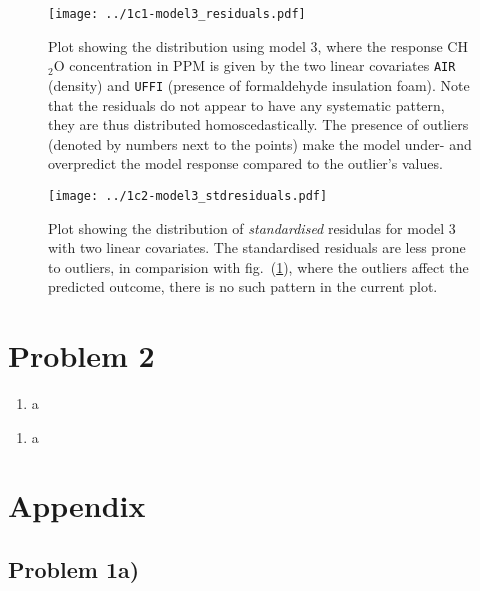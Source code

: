 \documentclass[a4paper,11pt]{article}
\begin{document}
\begin{enumerate}[label=\alph*)]
        \begin{figure}[htb]
            \centering
            \texttt{[image: ../1c1-model3\_residuals.pdf]}
            \caption{Plot showing the distribution using model 3, where the response CH$_2$O concentration in PPM is given by the two linear covariates \texttt{AIR} (density) and \texttt{UFFI} (presence of formaldehyde insulation foam). Note that the residuals do not appear to have any systematic pattern, they are thus distributed homoscedastically. The presence of outliers (denoted by numbers next to the points) make the model under- and overpredict the model response compared to the outlier's values. }
            \label{fig:1c-1}
        \end{figure}
        \begin{figure}[htb]
            \centering
            \texttt{[image: ../1c2-model3\_stdresiduals.pdf]}
            \caption{Plot showing the distribution of \textit{standardised} residulas for model 3 with two linear covariates. The standardised residuals are less prone to outliers, in comparision with fig.~(\ref{fig:1c-1}), where the outliers affect the predicted outcome, there is no such pattern in the current plot. }
            \label{fig:1c-2}
        \end{figure}
\end{enumerate}

\section*{Problem 2}
\begin{enumerate}[label=\alph*)]

    \item a
\end{enumerate}


\begin{enumerate}[resume*]
    \item a
\end{enumerate}



%
%

\clearpage
\appendix
\section{Appendix}
\label{sec:appendix}

\subsection{Problem 1a)}
\label{app:b}
\end{document}

